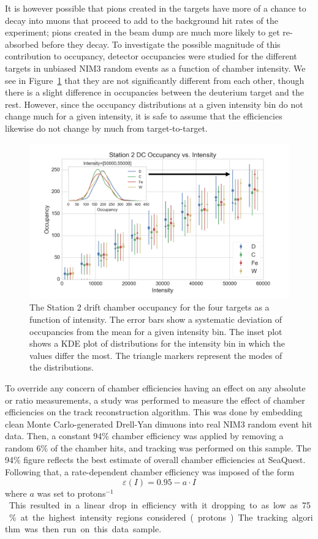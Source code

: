 It is however possible that pions created in the targets have more of a chance to decay into muons that proceed to add to the background hit rates of the experiment; pions created in the beam dump are much more likely to get re-absorbed before they decay. To investigate the possible magnitude of this contribution to occupancy, detector occupancies were studied for the different targets in unbiased NIM3 random events as a function of chamber intensity. We see in Figure~\ref{fig:occ-int-targ} that they are not significantly different from each other, though there is a slight difference in occupancies between the deuterium target and the rest. However, since the occupancy distributions at a given intensity bin do not change much for a given intensity, it is safe to assume that the efficiencies likewise do not change by much from target-to-target.
\begin{figure}
	\centering
	\includegraphics[width=5in]{figures/analysis/targ-occupancy.png}
	\caption{The Station 2 drift chamber occupancy for the four targets as a function of intensity. The error bars show a systematic deviation of occupancies from the mean for a given intensity bin. The inset plot shows a KDE plot of distributions for the intensity bin in which the values differ the most. The triangle markers represent the modes of the distributions.}
	\label{fig:occ-int-targ}
\end{figure}

To override any concern of chamber efficiencies having an effect on any absolute or ratio measurements, a study was performed to measure the effect of chamber efficiencies on the track reconstruction algorithm. This was done by embedding clean Monte Carlo-generated Drell-Yan dimuons into real NIM3 random event hit data. Then, a constant 94\% chamber efficiency was applied by removing a random 6\% of the chamber hits, and tracking was performed on this sample. The 94\% figure reflects the best estimate of overall chamber efficiencies at SeaQuest. Following that, a rate-dependent chamber efficiency was imposed of the form
\begin{equation}
\varepsilon(I) = 0.95 - a \cdot I
\end{equation}
where $a$ was set to \unit[2e-6]{protons$^{-1}$}. This resulted in a linear drop in efficiency with it dropping to as low as 75\% at the highest intensity regions considered (\unit[100000]{protons}). The tracking algorithm was then run on this data sample.
	

